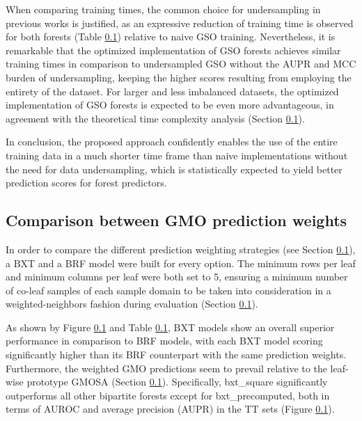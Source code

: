 
When comparing training times, the common choice for undersampling in previous works is justified, as an expressive reduction of training time is observed for both forests (Table \ref{}) relative to naive GSO training. Nevertheless, it is remarkable that the optimized implementation of GSO forests achieves similar training times in comparison to undersampled GSO without the AUPR and MCC burden of undersampling, keeping the higher scores resulting from employing the entirety of the dataset. For larger and less imbalanced datasets, the optimized implementation of GSO forests is expected to be even more advantageous, in agreement with the theoretical time complexity analysis (Section \ref{}).

%    

In conclusion, the proposed approach confidently enables the use of the entire training data in a much shorter time frame than naive implementations without the need for data undersampling, which is statistically expected to yield better prediction scores for forest predictors.


\subsection{Comparison between GMO prediction weights}

In order to compare the different prediction weighting strategies (see Section \ref{}), a BXT and a BRF model were built for every option. The minimum rows per leaf and minimum columns per leaf were both set to 5, ensuring a minimum number of co-leaf samples of each sample domain to be taken into consideration in a weighted-neighbors fashion during evaluation (Section \ref{}).

As shown by Figure \ref{} and Table \ref{}, BXT models show an overall superior performance in comparison to BRF models, with each BXT model scoring significantly higher than its BRF counterpart with the same prediction weights. Furthermore, the weighted GMO predictions seem to prevail relative to the leaf-wise prototype GMOSA (Section \ref{}). Specifically, bxt\_square significantly outperforms all other bipartite forests except for bxt\_precomputed, both in terms of AUROC and average precision (AUPR) in the TT sets (Figure \ref{}).

